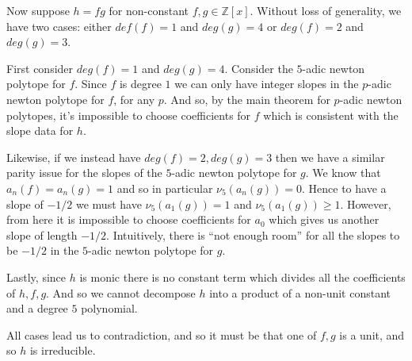 \documentclass[12pt,letterpaper,boxed]{hmcpset}
\newcommand{\Z}{\mathbb Z}
\begin{document}
\begin{solution}
\begin{itemize}
Now suppose $h = fg$ for non-constant $f,g \in \Z[x]$.
Without loss of generality, we have two cases: either $def(f) = 1$ and $deg(g) = 4$ or $deg(f) =
2$ and $deg(g) = 3$.

First consider $deg(f) = 1$ and $deg(g) = 4$. Consider the $5$-adic
newton polytope for $f$. Since $f$ is degree $1$ we can only have
integer slopes in the $p$-adic newton polytope for $f$, for any $p$. 
And so, by the main theorem for $p$-adic newton polytopes, it's
impossible to choose coefficients for $f$ which is consistent with the
slope data for $h$.

Likewise, if we instead have $deg(f) = 2, deg(g) = 3$ then we have a
similar parity issue for the slopes of the $5$-adic newton polytope
for $g$. We know that $a_n(f) = a_n(g) = 1$ and so in particular
$\nu_5(a_n(g)) = 0$. Hence to have a slope of $-1/2$ we must have
$\nu_5(a_1(g)) = 1$ and $\nu_5(a_1(g)) \geq 1$. However, from here it
is impossible to choose coefficients for $a_0$ which gives us another
slope of length $-1/2$. Intuitively, there is ``not enough room''
for all the slopes to be $-1/2$ in the $5$-adic newton polytope for
$g$.

Lastly, since $h$ is monic there is no constant term which divides all
the coefficients of $h,f,g$. And so we cannot decompose $h$ into a
product of a non-unit constant and a degree $5$ polynomial.

All cases lead us to contradiction, and so it must be that one of
$f,g$ is a unit, and so $h$ is irreducible. 



\end{itemize}
\end{solution}
\end{document}
